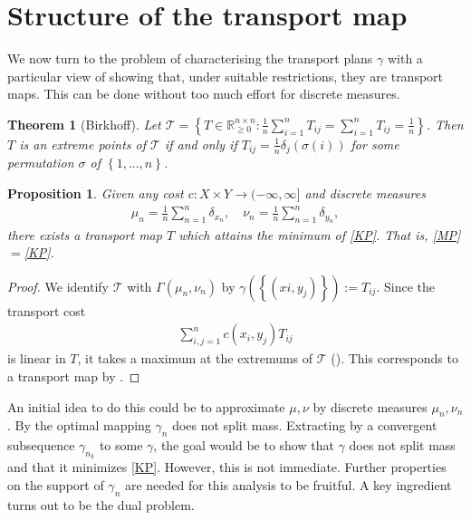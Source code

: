 \documentclass[
    a4paper,
    DIV=14,
    abstract=true,
    numbers=noenddot
]
{scrartcl}
\newtheorem{theorem}{Theorem}[section]
\newtheorem{proposition}[proposition]{Proposition}
\theoremstyle{definition}
\newcommand{\set}[1]{\left\{#1\right\}}
\newcommand{\R}{\mathbb{R}}
\newcommand{\Tt}{\mathcal{T}}
\begin{document}
\section{Structure of the transport map}
We now turn to the problem of characterising the transport plans $\gamma $ with a particular view of showing that, under suitable restrictions, they are transport maps.  This can be done without too much effort for discrete measures.
\begin{theorem}[Birkhoff]\label{Birkhoff theorem}
    Let $\mathcal{T}= \set{T \in \R^{n\times n}_{\geq 0}:\frac{1}{n} \sum_{i=1}^n T_{ij}=\sum_{i=1}^n T_{ij}=\frac{1}{n}} $. Then $T$ is an extreme points of $\Tt$  if and only if $T_{ij}= \frac{1}{n} \delta_{j}(\sigma(i)) $ for some permutation $\sigma $ of $\set{1,...,n}$.
\end{theorem}
\begin{proposition}\label{discrete transport well posed}
    Given any cost $c:X \times Y \to (-\infty,\infty]$ and discrete measures
    \begin{align*}
        \mu _n =\frac{1}{n}\sum_{n=1}^n \delta_{x_n}, \quad \nu _n = \frac{1}{n}\sum_{n=1}^n \delta _{y_n},
    \end{align*}
    there exists a transport map $T$ which attains the minimum of \eqref{KP}. That is, \eqref{MP}$=$\eqref{KP}.
\end{proposition}
\begin{proof}
    We identify $\mathcal{T}$ with $\Gamma (\mu _n, \nu _n)$ by $\gamma(\set{(xi,y_j)}):= T_{ij}$. Since the transport cost
    \begin{align*}
        \sum_{i,j=1}^n c(x_i,y_j)T_{ij}
    \end{align*}
    is linear in $T$, it takes a maximum at the extremums of $\Tt$ (). This corresponds to a transport map by  .
\end{proof}




An initial idea to do this could be to approximate $\mu , \nu $ by discrete measures $\mu_n , \nu _n$. By  the optimal mapping $\gamma _n$ does not split mass. Extracting by  a convergent subsequence $\gamma _{n_k}$ to some $\gamma $, the goal would be to show that $\gamma $ does not split mass and that it minimizes \eqref{KP}. However, this is not immediate. Further properties on the support of $\gamma _n$ are needed for this analysis to be fruitful.
A key ingredient turns out to be the dual problem.
\end{document}
